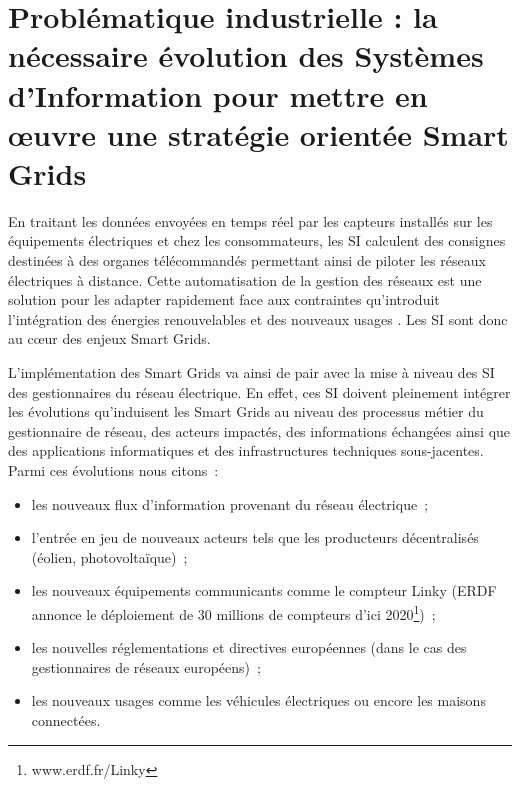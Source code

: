 \section{Problématique industrielle : la nécessaire évolution des Systèmes 
d'Information pour mettre en œuvre une stratégie orientée Smart Grids}


En traitant les données envoyées en temps réel par les capteurs installés sur 
les équipements électriques et chez les consommateurs, les SI calculent des 
consignes destinées à des organes télécommandés permettant ainsi de piloter les 
réseaux électriques à distance. 
Cette automatisation de la gestion des réseaux est une solution pour les adapter 
rapidement face aux contraintes qu'introduit l'intégration des énergies 
renouvelables et des nouveaux usages \cite{cre}. Les SI sont donc au cœur des 
enjeux Smart Grids.  

L'implémentation des Smart Grids va ainsi de pair avec la mise à niveau des SI 
des gestionnaires du réseau électrique. En effet, ces SI doivent pleinement 
intégrer les évolutions qu'induisent les Smart Grids au niveau des processus 
métier du gestionnaire de réseau, des acteurs impactés, des informations 
échangées ainsi que des applications informatiques et des infrastructures 
techniques sous-jacentes. Parmi ces évolutions nous citons~:
\begin{itemize}
\item les nouveaux flux d'information provenant du réseau électrique~;
\item l'entrée en jeu de nouveaux acteurs tels que les producteurs décentralisés 
(éolien, photovoltaïque)~;
\item les nouveaux équipements communicants comme le compteur Linky (ERDF 
annonce le déploiement de 30 millions de compteurs d'ici 
2020\footnote{www.erdf.fr/Linky})~;
\item les nouvelles réglementations et directives européennes (dans le cas des 
gestionnaires de réseaux européens)~;
\item les nouveaux usages comme les véhicules électriques ou encore les maisons 
connectées.
\end{itemize}

